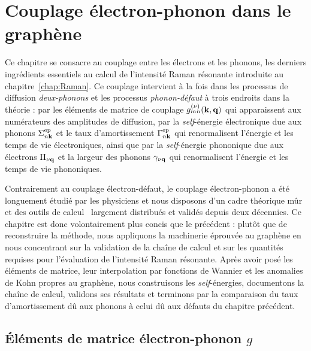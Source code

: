 \chapter{Couplage électron-phonon dans le graphène}\label{chap:eph}

Ce chapitre se consacre au couplage entre les électrons et les phonons, les derniers ingrédients essentiels au calcul de l'intensité Raman résonante introduite au chapitre~\ref{chap:Raman}. Ce couplage intervient à la fois dans les processus de diffusion \textit{deux-phonons} et les processus \textit{phonon-défaut} à trois endroits dans la théorie : par les éléments de matrice de couplage $g_{mn}^{(\nu)}(\mathbf{k},\mathbf{q})$ qui apparaissent aux numérateurs des amplitudes de diffusion, par la \textit{self}-énergie électronique due aux phonons $\Sigma^\text{ep}_{n\mathbf{k}}$ et le taux d'amortissement $\Gamma_{n\mathbf{k}}^\text{ep}$ qui renormalisent l'énergie et les temps de vie électroniques, ainsi que par la \textit{self}-énergie phononique due aux électrons $\Pi_{\nu\mathbf{q}}$ et la largeur des phonons $\gamma_{\nu\mathbf{q}}$ qui renormalisent l'énergie et les temps de vie phononiques.

Contrairement au couplage électron-défaut, le couplage électron-phonon a été longuement étudié par les physiciens et nous disposons d'un cadre théorique mûr~\cite{giustinoElectronphononInteractionUsing2007,giustinoElectronphononInteractionsFirst2017} et des outils de calcul~\cite{ponceEPWElectronphononCoupling2016,leeElectronPhononPhysics2023a,zhouPerturboSoftwarePackage2021,gonzeAbinitProjectImpact2020,bruninPhononlimitedElectronMobility2020} largement distribués et validés depuis deux décennies. Ce chapitre est donc volontairement plus concis que le précédent : plutôt que de reconstruire la méthode, nous appliquons la machinerie éprouvée au graphène en nous concentrant sur la validation de la chaîne de calcul et sur les quantités requises pour l'évaluation de l'intensité Raman résonante. Après avoir posé les éléments de matrice, leur interpolation par fonctions de Wannier et les anomalies de Kohn propres au graphène, nous construisons les \textit{self}-énergies, documentons la chaîne de calcul, validons ses résultats et terminons par la comparaison du taux d'amortissement dû aux phonons à celui dû aux défauts du chapitre précédent.

\section{Éléments de matrice électron-phonon $g$}\label{sec:g}

